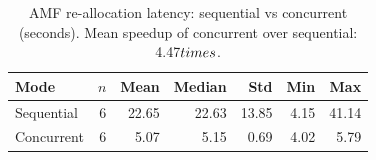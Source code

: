 \begin{table}[htbp]
\centering
\caption{AMF re-allocation latency: sequential vs concurrent (seconds). Mean speedup of concurrent over sequential: 4.47$\\times$.}
\label{tab:comparison}
\begin{tabular}{lrrrrrr}
\hline
Mode & $n$ & Mean & Median & Std & Min & Max \\
\hline
Sequential & 6 & 22.65 & 22.63 & 13.85 & 4.15 & 41.14 \\
Concurrent & 6 & 5.07 & 5.15 & 0.69 & 4.02 & 5.79 \\
\hline
\end{tabular}
\end{table}
